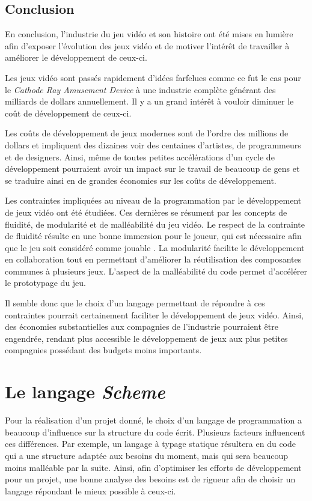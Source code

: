 \documentclass[12pt,twoside,letterpaper,francais]{book}
\newcommand{\Schemelang}{{\textit{Scheme }}}
\begin{document}
\FloatBarrier
\section{Conclusion}
En conclusion, l'industrie du jeu vidéo et son histoire ont été mises
en lumière afin d'exposer l'évolution des jeux vidéo et de motiver
l'intérêt de travailler à améliorer le développement de ceux-ci.

Les jeux vidéo sont passés rapidement d'idées farfelues comme ce fut
le cas pour le \textit{Cathode Ray Amusement Device} à une industrie
complète générant des milliards de dollars annuellement. Il y a un
grand intérêt à vouloir diminuer le coût de développement de
ceux-ci. 

Les coûts de développement de jeux modernes sont de l'ordre des
millions de dollars et impliquent des dizaines voir des centaines
d'artistes, de programmeurs et de designers. Ainsi, même de toutes
petites accélérations d'un cycle de développement pourraient avoir un
impact sur le travail de beaucoup de gens et se traduire ainsi en de
grandes économies sur les coûts de développement.

Les contraintes impliquées au niveau de la programmation par le
développement de jeux vidéo ont été étudiées. Ces dernières se
résument par les concepts de fluidité, de modularité et de
malléabilité du jeu vidéo. Le respect de la contrainte de fluidité
résulte en une bonne immersion pour le joueur, qui est nécessaire afin
que le jeu soit considéré comme \og jouable \fg. La modularité
facilite le développement en collaboration tout en permettant
d'améliorer la réutilisation des composantes communes à plusieurs
jeux. L'aspect de la malléabilité du code permet d'accélérer le
prototypage du jeu.

Il semble donc que le choix d'un langage permettant de répondre à ces
contraintes pourrait certainement faciliter le développement de jeux
vidéo. Ainsi, des économies substantielles aux compagnies de
l'industrie pourraient être engendrée, rendant plus accessible le
développement de jeux aux plus petites compagnies possédant des
budgets moins importants.


\clearpage

\chapter{Le langage \Schemelang} \label{Chap:Scheme}
Pour la réalisation d'un projet donné, le choix d'un langage de
programmation a beaucoup d'influence sur la structure du code
écrit. Plusieurs facteurs influencent ces différences. Par exemple, un
langage à typage statique résultera en du code qui a une structure
adaptée aux besoins du moment, mais qui sera beaucoup moins malléable
par la suite. Ainsi, afin d'optimiser les efforts de développement
pour un projet, une bonne analyse des besoins est de rigueur afin de
choisir un langage répondant le mieux possible à ceux-ci.
\end{document}
